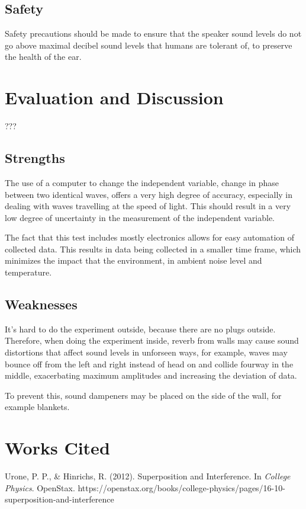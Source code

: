 \documentclass[12pt]{article}
\begin{document}
\subsection{Safety}

Safety precautions should be made to ensure that the speaker sound levels do not go above maximal decibel sound levels that humans are tolerant of, to preserve the health of the ear.

\section{Evaluation and Discussion}???

\subsection{Strengths}

The use of a computer to change the independent variable, change in phase between two identical waves, offers a very high degree of accuracy, especially in dealing with waves travelling at the speed of light. This should result in a very low degree of uncertainty in the measurement of the independent variable.

The fact that this test includes mostly electronics allows for easy automation of collected data. This results in data being collected in a smaller time frame, which minimizes the impact that the environment, in ambient noise level and temperature.

\subsection{Weaknesses}

It's hard to do the experiment outside, because there are no plugs outside. Therefore, when doing the experiment inside, reverb from walls may cause sound distortions that affect sound levels in unforseen ways, for example, waves may bounce off from the left and right instead of head on and collide fourway in the middle, exacerbating maximum amplitudes and increasing the deviation of data.

To prevent this, sound dampeners may be placed on the side of the wall, for example blankets.

\section{Works Cited}

Urone, P. P., \& Hinrichs, R. (2012). Superposition and Interference. In \textit{College Physics}. OpenStax. https://openstax.org/books/college-physics/pages/16-10-superposition-and-interference
\end{document}
